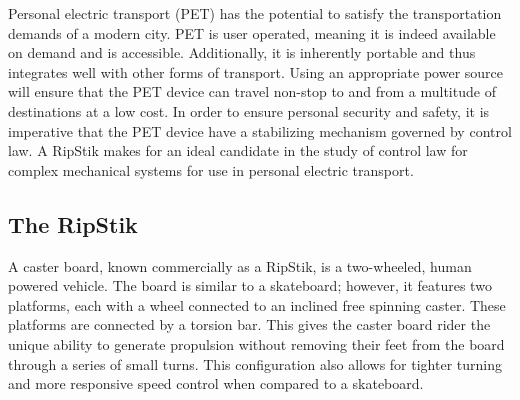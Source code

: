 \documentclass[12pt,letterpaper]{article}
\begin{document}
Personal electric transport (PET) has the potential to satisfy the transportation demands of a modern city. 
PET is user operated, meaning it is indeed available on demand and is accessible. 
Additionally, it is inherently portable and thus integrates well with other forms of transport. 
Using an appropriate power source will ensure that the PET device can travel non-stop to and from a multitude of destinations at a low cost. 
In order to ensure personal security and safety, it is imperative that the PET device have a stabilizing mechanism governed by control law. 
A RipStik makes for an ideal candidate in the study of control law for complex mechanical systems for use in personal electric transport. 

\subsection{The RipStik}

A caster board, known commercially as a RipStik, is a two-wheeled, human powered vehicle. 
The board is similar to a skateboard; however, it features two platforms, each with a wheel connected to an inclined free spinning caster. 
These platforms are connected by a torsion bar. 
This gives the caster board rider the unique ability to generate propulsion without removing their feet from the board through a series of small turns. 
This configuration also allows for tighter turning and more responsive speed control when compared to a skateboard. 
\end{document}
